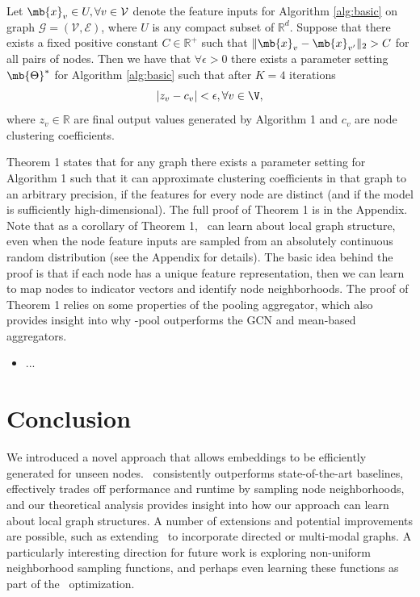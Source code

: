 \begin{theorem}\label{thm:main}
Let $\mb{x}_v \in U, \forall v \in \mathcal{V}$ denote the feature inputs for Algorithm \ref{alg:basic} on graph $\mathcal{G}=(\mathcal{V}, \mathcal{E})$, where $U$ is any compact subset of $\mathbb{R}^d$. Suppose that there exists a fixed positive constant $C \in \mathbb{R}^+$ such that $\|\mb{x}_v  - \mb{x}_{v'}\|_2 > C$ for all pairs of nodes. Then we have that $\forall \epsilon > 0$ there exists a parameter setting $\mb{\Theta}^*$ for Algorithm \ref{alg:basic} such that after $K=4$ iterations
$$|{z}_v - c_v| < \epsilon , \forall v \in \mathcal{\V},$$ where $z_v \in \mathbb{R}$ are final output values generated by Algorithm 1 and $c_v$ are node clustering coefficients.
\end{theorem}

Theorem 1 states that for any graph there exists a parameter setting for Algorithm 1 such that it can approximate clustering coefficients in that graph to an arbitrary precision, if the features for every node are distinct (and if the model is sufficiently high-dimensional). 
The full proof of Theorem 1 is in the Appendix. 
Note that as a corollary of Theorem 1, \name\ can learn about local graph structure, even when the node feature inputs are sampled from an absolutely continuous random distribution (see the Appendix for details).
The basic idea behind the proof is that if each node has a unique feature representation, then we can learn to map nodes to indicator vectors and identify node neighborhoods.
The proof of Theorem 1 relies on some properties of the pooling aggregator, which also provides insight into why \name-pool outperforms the GCN and mean-based aggregators. %

\begin{itemize}
	\item ...
\end{itemize}

\section{Conclusion}

We introduced a novel approach that allows embeddings to be efficiently generated for unseen nodes. 
\name\ consistently outperforms state-of-the-art baselines, effectively trades off performance and runtime by sampling node neighborhoods, and our theoretical analysis provides insight into how our approach can learn about local graph structures. 
A number of extensions and potential improvements are possible, such as extending \name\ to incorporate directed or multi-modal graphs. 
A particularly interesting direction for future work is exploring non-uniform neighborhood sampling functions, and perhaps even learning these functions as part of the \name\ optimization. 

